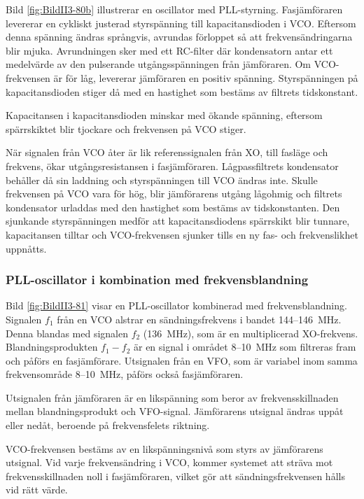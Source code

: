 Bild \ref{fig:BildII3-80b} illustrerar en oscillator med PLL-styrning.
Fasjämföraren levererar en cykliskt justerad styrspänning till
kapacitansdioden i VCO.
Eftersom denna spänning ändras språngvis, avrundas förloppet så att 
frekvensändringarna blir mjuka.
Avrundningen sker med ett RC-filter där kondensatorn antar ett medelvärde av 
den pulserande utgångsspänningen från jämföraren.
Om VCO-frekvensen är för låg, levererar jämföraren en positiv spänning.
Styrspänningen på kapacitansdioden stiger då med en hastighet som bestäms av
filtrets tidskonstant.

Kapacitansen i kapacitansdioden minskar med ökande spänning, eftersom
spärrskiktet blir tjockare och frekvensen på VCO stiger.

När signalen från VCO åter är lik referenssignalen från XO, till
fasläge och frekvens, ökar utgångsresistansen i fasjämföraren.
Lågpassfiltrets kondensator behåller då sin laddning och styrspänningen till 
VCO ändras inte.
Skulle frekvensen på VCO vara för hög, blir jämförarens utgång lågohmig och
filtrets kondensator urladdas med den hastighet som bestäms av tidskonstanten.
Den sjunkande styrspänningen medför att kapacitansdiodens spärrskikt blir
tunnare, kapacitansen tilltar och VCO-frekvensen sjunker tills en ny fas- och
frekvenslikhet uppnåtts.

\subsubsection{PLL-oscillator i kombination med frekvensblandning}


Bild \ref{fig:BildII3-81} visar en PLL-oscillator kombinerad med
frekvensblandning.
Signalen \(f_1\) från en VCO alstrar en sändningsfrekvens i bandet
144--146~MHz.
Denna blandas med signalen \(f_2\) (136~MHz), som är en multiplicerad
XO-frekvens.
Blandningsprodukten \(f_1 - f_2\) är en signal i området 8--10~MHz som 
filtreras fram och påförs en fasjämförare.
Utsignalen från en VFO, som är variabel inom samma frekvensområde 8--10~MHz,
påförs också fasjämföraren.

Utsignalen från jämföraren är en likspänning som beror av frekvensskillnaden
mellan blandningsprodukt och VFO-signal.
Jämförarens utsignal ändras uppåt eller nedåt, beroende på frekvensfelets
riktning.

VCO-frekvensen bestäms av en likspänningsnivå som styrs av jämförarens
utsignal.
Vid varje frekvensändring i VCO, kommer systemet att sträva mot
frekvensskillnaden noll i fasjämföraren, vilket gör att sändningsfrekvensen
hålls vid rätt värde.

